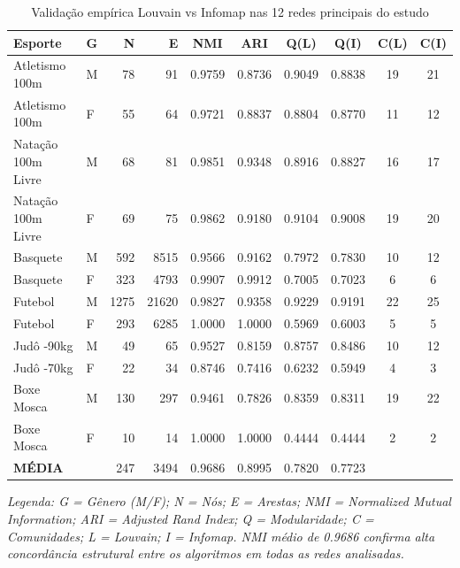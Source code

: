 \begin{table}[h]
\centering
\caption{Validação empírica Louvain vs Infomap nas 12 redes principais do estudo}
\label{tab:louvain_infomap_validation_12networks}
\small
\begin{tabular}{llrrcccccc}
\hline
\textbf{Esporte} & \textbf{G} & \textbf{N} & \textbf{E} & \textbf{NMI} & \textbf{ARI} & \textbf{Q(L)} & \textbf{Q(I)} & \textbf{C(L)} & \textbf{C(I)} \\
\hline
Atletismo 100m & M & 78 & 91 & 0.9759 & 0.8736 & 0.9049 & 0.8838 & 19 & 21 \\
Atletismo 100m & F & 55 & 64 & 0.9721 & 0.8837 & 0.8804 & 0.8770 & 11 & 12 \\
Natação 100m Livre & M & 68 & 81 & 0.9851 & 0.9348 & 0.8916 & 0.8827 & 16 & 17 \\
Natação 100m Livre & F & 69 & 75 & 0.9862 & 0.9180 & 0.9104 & 0.9008 & 19 & 20 \\
Basquete & M & 592 & 8515 & 0.9566 & 0.9162 & 0.7972 & 0.7830 & 10 & 12 \\
Basquete & F & 323 & 4793 & 0.9907 & 0.9912 & 0.7005 & 0.7023 & 6 & 6 \\
Futebol & M & 1275 & 21620 & 0.9827 & 0.9358 & 0.9229 & 0.9191 & 22 & 25 \\
Futebol & F & 293 & 6285 & 1.0000 & 1.0000 & 0.5969 & 0.6003 & 5 & 5 \\
Judô -90kg & M & 49 & 65 & 0.9527 & 0.8159 & 0.8757 & 0.8486 & 10 & 12 \\
Judô -70kg & F & 22 & 34 & 0.8746 & 0.7416 & 0.6232 & 0.5949 & 4 & 3 \\
Boxe Mosca & M & 130 & 297 & 0.9461 & 0.7826 & 0.8359 & 0.8311 & 19 & 22 \\
Boxe Mosca & F & 10 & 14 & 1.0000 & 1.0000 & 0.4444 & 0.4444 & 2 & 2 \\
\hline
\textbf{MÉDIA} &  & 247 & 3494 & 0.9686 & 0.8995 & 0.7820 & 0.7723 &  &  \\
\hline
\end{tabular}

\vspace{0.3cm}

\footnotesize
\textit{Legenda: G = Gênero (M/F); N = Nós; E = Arestas; NMI = Normalized Mutual Information; ARI = Adjusted Rand Index; Q = Modularidade; C = Comunidades; L = Louvain; I = Infomap. NMI médio de 0.9686 confirma alta concordância estrutural entre os algoritmos em todas as redes analisadas.}
\end{table}
